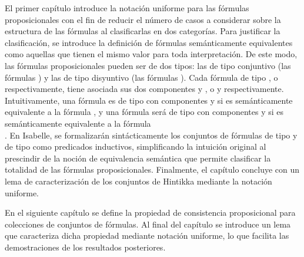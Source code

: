 \begin{isabellebody}
\begin{isamarkuptext}
  El primer capítulo introduce la notación uniforme para las fórmulas
  proposicionales con el fin de reducir el número de casos a considerar sobre 
  la estructura de las fórmulas al clasificarlas en dos categorías. Para 
  justificar la clasificación, se introduce la definición de fórmulas 
  semánticamente equivalentes como aquellas que tienen el mismo 
  valor para toda interpretación. De este modo, las fórmulas proposicionales
  pueden ser de dos tipos: las de tipo conjuntivo (las fórmulas \isa{{\isasymalpha}}) y las 
  de tipo disyuntivo (las fórmulas \isa{{\isasymbeta}}). Cada fórmula de tipo \isa{{\isasymalpha}}, o \isa{{\isasymbeta}} 
  respectivamente, tiene asociada sus dos componentes  y , o  y 
   respectivamente. Intuitivamente, una fórmula es de tipo \isa{{\isasymalpha}} con 
  componentes  y  si es semánticamente equivalente a la fórmula 
  , y una fórmula será de tipo \isa{{\isasymbeta}} con componentes  y  si es 
  semánticamente equivalente a la fórmula\\ . En Isabelle, se formalizarán
  sintácticamente los conjuntos de fórmulas de tipo \isa{{\isasymalpha}} y de tipo \isa{{\isasymbeta}} como
  predicados inductivos, simplificando la intuición original al prescindir 
  de la noción de equivalencia semántica que permite clasificar la totalidad 
  de las fórmulas proposicionales. Finalmente, el capítulo concluye con un lema
  de caracterización de los conjuntos de Hintikka mediante la notación uniforme.

  En el siguiente capítulo se define la propiedad de consistencia proposicional
  para colecciones de conjuntos de fórmulas. Al final del capítulo se introduce 
  un lema que caracteriza dicha propiedad mediante notación uniforme, lo que 
  facilita las demostraciones de los resultados posteriores.


\end{isamarkuptext}
\end{isabellebody}
